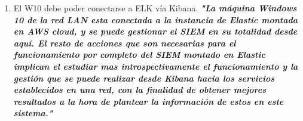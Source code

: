 \documentclass[12pt,oneside,a4paper]{book}
\begin{document}
\begin{enumerate}
    \newpage
    \item El W10 debe poder conectarse a ELK vía Kibana.
    \newline
    \newline
    \textbf{\textit{"La máquina Windows 10 de la red LAN esta conectada a la instancia de Elastic montada en AWS cloud, y se puede gestionar el SIEM en su totalidad desde aquí. El resto de acciones que son necesarias para el funcionamiento por completo del SIEM montado en Elastic implican el estudiar mas introspectivamente el funcionamiento y la gestión que se puede realizar desde Kibana hacia los servicios establecidos en una red, con la finalidad de obtener mejores resultados a la hora de plantear la información de estos en este sistema."}}
    \newline
\end{enumerate}
\end{document}
